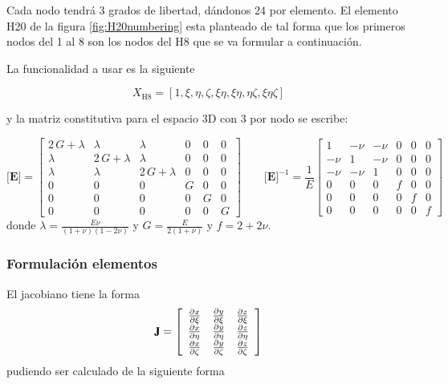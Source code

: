 \documentclass[11pt, a4paper,titlepage]{article}
\newcommand{\rmfontbf}[1]{{\fontfamily{ptm}\selectfont%
\textbf{#1}}}
\newcommand{\jac}{\rmfontbf{J}}
\newcommand{\Mme}[1]{\boldsymbol{[}\mathbf{#1} \boldsymbol{]}}
\newcommand{\ME}{\Mme{E}}
\newcommand{\spartial}[2]{\ensuremath{\frac{\partial #1}{\partial #2}}}
\begin{document}
Cada nodo tendrá $3$ grados de libertad, dándonos $24$ \dof{} por elemento. El elemento H20 de la figura \ref{fig:H20numbering} esta planteado de tal forma que los primeros nodos del 1 al 8 son los nodos del H8 que se va formular a continuación.

La funcionalidad a usar es la siguiente

\[
X_{\mathrm{H8}} = \left[1, \xi, \eta, \zeta, \xi \eta, \xi \eta, \eta \zeta, \xi \eta \zeta \right]
\]


y la matriz constitutiva para el espacio 3D con 3 \dof{} por nodo se escribe:

\begin{equation}
	\ME =\left[\begin{array}{cccccc} 2\,G+\lambda  & \lambda  & \lambda  & 0 & 0 & 0\\ \lambda  & 2\,G+\lambda  & \lambda  & 0 & 0 & 0\\ \lambda  & \lambda  & 2\,G+\lambda  & 0 & 0 & 0\\ 0 & 0 & 0 & G & 0 & 0\\ 0 & 0 & 0 & 0 & G & 0\\ 0 & 0 & 0 & 0 & 0 & G \end{array}\right] \qquad \ME^{-1}=\frac{1}{E}\left[\begin{array}{cccccc} 1 & -\nu  & -\nu  & 0 & 0 & 0\\ -\nu  & 1 & -\nu  & 0 & 0 & 0\\ -\nu  & -\nu  & 1 & 0 & 0 & 0\\ 0 & 0 & 0 & f & 0 & 0\\ 0 & 0 & 0 & 0 & f & 0\\ 0 & 0 & 0 & 0 & 0 & f \end{array}\right]
\end{equation}
donde $\lambda = \frac{E \nu}{(1+\nu)(1-2\nu)}$ y $G=\frac{E}{2(1+\nu)}$ y $f = 2+2\nu$.

\subsubsection*{Formulación elementos}
El jacobiano tiene la forma
\[
\jac=
\left[\begin{array}{lll}\spartial{x}{\xi} & \spartial{y}{\xi}  & \spartial{z}{\xi}  \\ \spartial{x}{\eta}  &\spartial{y}{\eta}  &\spartial{z}{\eta} \\\spartial{x}{\zeta} & \spartial{y}{\zeta} &\spartial{z}{\zeta}\end{array}\right]
\]
pudiendo ser calculado de la siguiente forma
\end{document}
